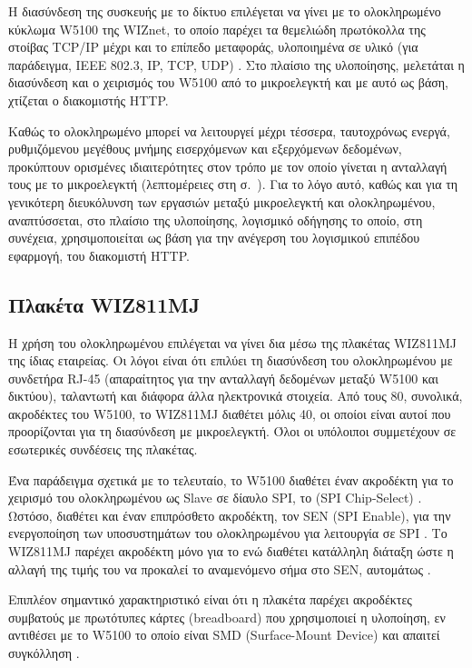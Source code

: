 Η διασύνδεση της συσκευής με το δίκτυο επιλέγεται να γίνει με το ολοκληρωμένο
κύκλωμα W5100 της WIZnet, το οποίο παρέχει τα θεμελιώδη πρωτόκολλα της στοίβας
TCP/IP μέχρι και το επίπεδο μεταφοράς, υλοποιημένα σε υλικό (για παράδειγμα,
IEEE 802.3, IP, TCP, UDP) \parencite[4--5]{wiz11:w5100}. Στο πλαίσιο της
υλοποίησης, μελετάται η διασύνδεση και ο χειρισμός του W5100 από το μικροελεγκτή
και με αυτό ως βάση, χτίζεται ο διακομιστής HTTP.

Καθώς το ολοκληρωμένο μπορεί να λειτουργεί μέχρι τέσσερα, ταυτοχρόνως ενεργά,
 ρυθμιζόμενου μεγέθους μνήμης εισερχόμενων και εξερχόμενων δεδομένων,
προκύπτουν ορισμένες ιδιαιτερότητες στον τρόπο με τον οποίο γίνεται η ανταλλαγή
τους με το μικροελεγκτή (λεπτομέρειες στη 
σ.~\pageref{ssubsec:network:rx-tx-buffer}).
Για το λόγο αυτό, καθώς και για τη γενικότερη διευκόλυνση των εργασιών μεταξύ
μικροελεγκτή και ολοκληρωμένου, αναπτύσσεται, στο πλαίσιο της υλοποίησης,
λογισμικό οδήγησης το οποίο, στη συνέχεια, χρησιμοποιείται ως βάση για την
ανέγερση του λογισμικού επιπέδου εφαρμογή, του διακομιστή HTTP.


\subsection{Πλακέτα WIZ811MJ}

Η χρήση του ολοκληρωμένου επιλέγεται να γίνει δια μέσω της πλακέτας WIZ811MJ της
ίδιας εταιρείας. Οι λόγοι είναι ότι επιλύει τη διασύνδεση του ολοκληρωμένου με
συνδετήρα RJ-45 (απαραίτητος για την ανταλλαγή δεδομένων μεταξύ W5100 και
δικτύου), ταλαντωτή και διάφορα άλλα ηλεκτρονικά στοιχεία. Από τους 80,
συνολικά, ακροδέκτες του W5100, το WIZ811MJ διαθέτει μόλις 40, οι οποίοι είναι
αυτοί που προορίζονται για τη διασύνδεση με μικροελεγκτή. Όλοι οι υπόλοιποι
συμμετέχουν σε εσωτερικές συνδέσεις της πλακέτας.

Ένα παράδειγμα σχετικά με το τελευταίο, το W5100 διαθέτει έναν ακροδέκτη για το
χειρισμό του ολοκληρωμένου ως Slave σε δίαυλο SPI, το 
(\textenglish{SPI Chip-Select}) \parencite[9]{wiz11:w5100}. Ωστόσο, διαθέτει και
έναν επιπρόσθετο ακροδέκτη, τον SEN (\textenglish{SPI Enable}), για την
ενεργοποίηση των υποσυστημάτων του ολοκληρωμένου για λειτουργία σε SPI
\parencite[8]{wiz11:w5100}. Το WIZ811MJ παρέχει ακροδέκτη μόνο για το 
ενώ διαθέτει κατάλληλη διάταξη ώστε η αλλαγή της τιμής του να προκαλεί το
αναμενόμενο σήμα στο SEN, αυτομάτως \parencite[7]{wiz13:811mj}.

Επιπλέον σημαντικό χαρακτηριστικό είναι ότι η πλακέτα παρέχει ακροδέκτες
συμβατούς με πρωτότυπες κάρτες (\textenglish{breadboard}) που χρησιμοποιεί η
υλοποίηση, εν αντιθέσει με το W5100 το οποίο είναι SMD
(\textenglish{Surface-Mount Device}) και απαιτεί συγκόλληση
\parencite[6,12]{wiz13:811mj}.


